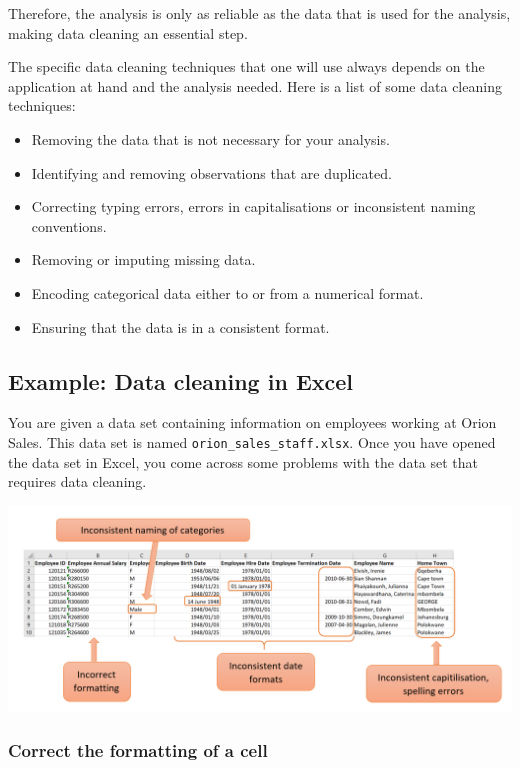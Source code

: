 \documentclass[
]{book}
\begin{document}
Therefore, the analysis is only as reliable as the data that is used for the analysis, making data cleaning an essential step.

The specific data cleaning techniques that one will use always depends on the application at hand and the analysis needed. Here is a list of some data cleaning techniques:

\begin{itemize}
\item
  Removing the data that is not necessary for your analysis.
\item
  Identifying and removing observations that are duplicated.
\item
  Correcting typing errors, errors in capitalisations or inconsistent naming conventions.
\item
  Removing or imputing missing data.
\item
  Encoding categorical data either to or from a numerical format.
\item
  Ensuring that the data is in a consistent format.
\end{itemize}

\subsection{Example: Data cleaning in Excel}\label{example-data-cleaning-in-excel}

You are given a data set containing information on employees working at Orion Sales. This data set is named \texttt{orion\_sales\_staff.xlsx}. Once you have opened the data set in Excel, you come across some problems with the data set that requires data cleaning.

\begin{center}\includegraphics[width=0.7\linewidth]{Figures/cleaning_overview} \end{center}

\subsubsection*{Correct the formatting of a cell}\label{correct-the-formatting-of-a-cell}
\end{document}
